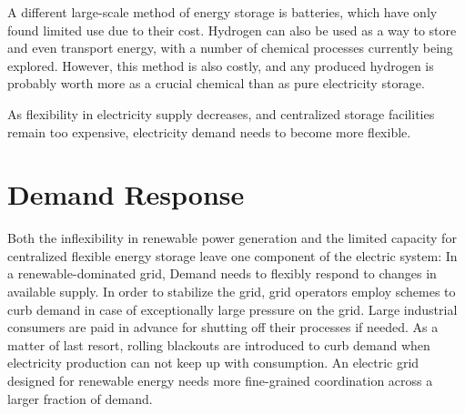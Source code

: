 A different large-scale method of energy storage is batteries, which have only found limited use due to their cost. Hydrogen can also be used as a way to store and even transport energy, with a number of chemical processes currently being explored.
However, this method is also costly, and any produced hydrogen is probably worth more as a crucial chemical than as pure electricity storage.

As flexibility in electricity supply decreases, and centralized storage facilities remain too expensive, electricity demand needs to become more flexible.


\section{Demand Response}

Both the inflexibility in renewable power generation and the limited capacity for centralized flexible energy storage leave one component of the electric system: In a renewable-dominated grid, Demand needs to flexibly respond to changes in available supply.
In order to stabilize the grid, grid operators employ schemes to curb demand in case of exceptionally large pressure on the grid.
Large industrial consumers are paid in advance for shutting off their processes if needed.
As a matter of last resort, rolling blackouts are introduced to curb demand when electricity production can not keep up with consumption.
An electric grid designed for renewable energy needs more fine-grained coordination across a larger fraction of demand.

